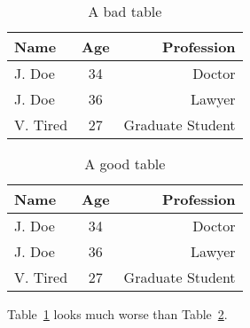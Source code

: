 
\begin{table}[h]
\centering %
\begin{tabular}{|l|c|r|}
\hline
Name & Age & Profession\\
\hline
J. Doe & 34 & Doctor\\
\hline
J. Doe & 36 & Lawyer\\
\hline
V. Tired & 27 & Graduate Student\\
\hline
\end{tabular}
\caption{A bad table}
\label{tab:bad}
\end{table}


\begin{table}[h]
\centering
\begin{tabular}{lcr}
\toprule
Name & Age & Profession\\
\midrule
J. Doe & 34 & Doctor\\
J. Doe & 36 & Lawyer\\
V. Tired & 27 & Graduate Student\\
\bottomrule
\end{tabular}
\caption{A good table}
\label{tab:good}
\end{table}

Table~\ref{tab:bad} looks much worse than Table~\ref{tab:good}.